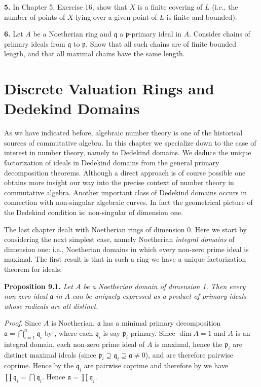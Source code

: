 \noindent\textbf{5.} In Chapter 5, Exercise 16, show that \(X\) is a finite covering of \(L\) (i.e., the number of points of \(X\) lying over a given point of \(L\) is finite and bounded).

\noindent\textbf{6.} Let \(A\) be a Noetherian ring and \(\mathfrak q\) a \(\mathfrak p\)-primary ideal in \(A\). Consider chains of primary ideals from \(\mathfrak q\) to \(\mathfrak p\). Show that all such chains are of finite bounded length, and that all maximal chains have the same length.

\section{Discrete Valuation Rings and Dedekind Domains}

As we have indicated before, algebraic number theory is one of the historical sources of commutative algebra. In this chapter we specialize down to the case of interest in number theory, namely to Dedekind domains. We deduce the unique factorization of ideals in Dedekind domains from the general primary decomposition theorems. Although a direct approach is of course possible one obtains more insight our way into the precise context of number theory in commutative algebra. Another important class of Dedekind domains occurs in connection with non-singular algebraic curves. In fact the geometrical picture of the Dedekind condition is: non-singular of dimension one.

The last chapter dealt with Noetherian rings of dimension 0. Here we start by considering the next simplest case, namely Noetherian \emph{integral domains} of dimension one: i.e., Noetherian domains in which every non-zero prime ideal is maximal. The first result is that in such a ring we have a unique factorization theorem for ideals:

\noindent\textbf{Proposition 9.1.} \emph{Let \(A\) be a Noetherian domain of dimension 1. Then every non-zero ideal \(\mathfrak a\) in \(A\) can be uniquely expressed as a product of primary ideals whose radicals are all distinct.}

\noindent\emph{Proof.} Since \(A\) is Noetherian, \(\mathfrak a\) has a minimal primary decomposition \(\mathfrak a=\bigcap_{i=1}^n\mathfrak q_i\) by , where each \(\mathfrak q_i\) is say \(\mathfrak p_i\)-primary. Since \(\dim A=1\) and \(A\) is an integral domain, each non-zero prime ideal of \(A\) is maximal, hence the \(\mathfrak p_i\) are distinct maximal ideals (since \(\mathfrak p_i\supseteq\mathfrak q_i\supseteq\mathfrak a\neq0\)), and are therefore pairwise coprime. Hence by  the \(\mathfrak q_i\) are pairwise coprime and therefore by  we have \(\prod\mathfrak q_i=\bigcap\mathfrak q_i\). Hence \(\mathfrak a=\prod\mathfrak q_i\).

